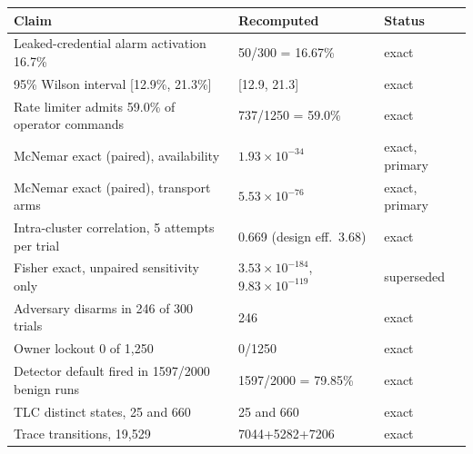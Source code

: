 \begin{longtable}{@{}p{}p{}p{}@{}}
\toprule
\textbf{Claim} & \textbf{Recomputed} & \textbf{Status} \\
\midrule
\endhead
Leaked-credential alarm activation 16.7\%        & 50/300 = 16.67\%        & exact \\
95\% Wilson interval [12.9\%, 21.3\%]            & [12.9, 21.3]            & exact \\
Rate limiter admits 59.0\% of operator commands  & 737/1250 = 59.0\%       & exact \\
McNemar exact (paired), availability             & $1.93\times10^{-34}$    & exact, primary \\
McNemar exact (paired), transport arms           & $5.53\times10^{-76}$    & exact, primary \\
Intra-cluster correlation, 5 attempts per trial  & 0.669 (design eff.\ 3.68) & exact \\
Fisher exact, unpaired sensitivity only          & $3.53\times10^{-184}$, $9.83\times10^{-119}$ & superseded \\
Adversary disarms in 246 of 300 trials           & 246                     & exact \\
Owner lockout 0 of 1,250                         & 0/1250                  & exact \\
Detector default fired in 1597/2000 benign runs   & 1597/2000 = 79.85\%     & exact \\
TLC distinct states, 25 and 660                  & 25 and 660              & exact \\
Trace transitions, 19,529                        & 7044+5282+7206          & exact \\
\bottomrule
\end{longtable}
